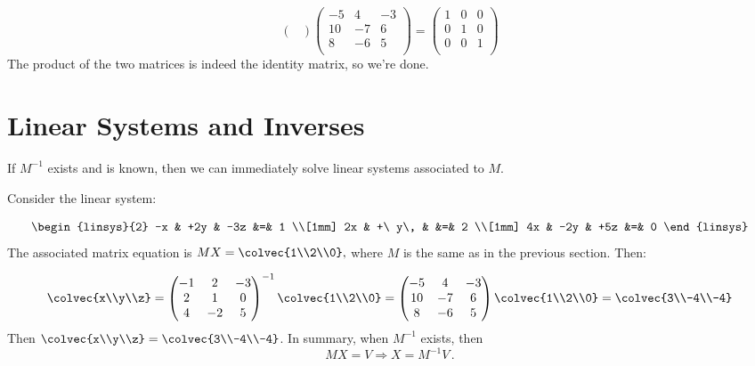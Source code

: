 \begin{example}
\[\begin{pmatrix}
\end{pmatrix}\begin{pmatrix}
-5 & 4 & -3 \\
10 & -7 & 6 \\
 8 & -6 & 5 \\
\end{pmatrix}
=\begin{pmatrix}
1 & 0 & 0 \\
0 & 1 & 0 \\
0 & 0 & 1 \\
\end{pmatrix}
\]  
The product of the two matrices is indeed the identity matrix, so we're done.
\end{example}

\section{Linear Systems and Inverses}

If $M^{-1}$ exists and is known, then we can immediately solve linear systems associated to $M$.

\begin{example}
Consider the linear system:

\[
      \begin{linsys}{2}
            -x & +2y & -3z         &=& 1  \\[1mm]
            2x & +\ y\,   &             &=& 2 \\[1mm]
            4x & -2y & +5z         &=& 0  
      \end{linsys}
\]
The associated matrix equation is $MX=\colvec{1\\2\\0},$ where \(M\) is the same as in the previous section.  Then:

\[
\colvec{x\\y\\z}=\begin{pmatrix}
-1 & 2 & -3 \\
2 & 1 & 0 \\
4 & -2 & 5 \\
\end{pmatrix}^{-1}\colvec{1\\2\\0}
=\begin{pmatrix}
-5 & 4 & -3 \\
10 & -7 & 6 \\
 8 & -6 & 5 \\
\end{pmatrix}\colvec{1\\2\\0}
=\colvec{3\\-4\\-4}
\]
Then $\colvec{x\\y\\z}=\colvec{3\\-4\\-4}$.  
In summary, when $M^{-1}$ exists, then \[MX=V \Rightarrow X=M^{-1}V\, .\]
\end{example}



